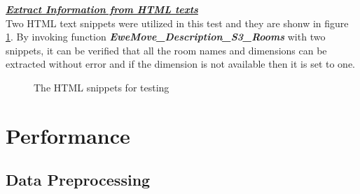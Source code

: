 \documentclass[12pt,twoside]{report}
\begin{document}
\textbf{\textit{\underline{Extract Information from HTML texts}}} \\
Two HTML text snippets were utilized in this test and they are shonw in figure \ref{html_room_info_test}. By invoking function \textit{\textbf{EweMove\_Description\_S3\_Rooms}} with two snippets, it can be verified that all the room names and dimensions can be extracted without error and if the dimension is not available then it is set to one. 
\begin{figure}[h]
	\centering
	\hfill
	\caption{The HTML snippets for testing}
	\label{html_room_info_test}
\end{figure}

\chapter{Performance}

\section{Data Preprocessing}
\end{document}
